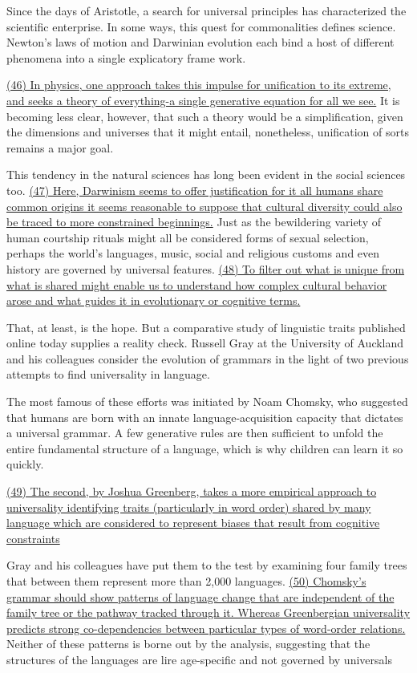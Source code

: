 Since the days of Aristotle, a search for universal principles has characterized the scientific enterprise. In some ways, this quest for commonalities defines science. Newton’s laws of motion and Darwinian evolution each bind a host of different phenomena into a single explicatory frame work.

\ul{(46) In physics, one approach takes this impulse for unification to its extreme, and seeks a theory of everything-a single generative equation for all we see.} It is becoming less clear, however, that such a theory would be a simplification, given the dimensions and universes that it might entail, nonetheless, unification of sorts remains a major goal.

This tendency in the natural sciences has long been evident in the social sciences too. \ul{(47) Here, Darwinism seems to offer justification for it all humans share common origins it seems reasonable to suppose that cultural diversity could also be traced to more constrained beginnings.} Just as the bewildering variety of human courtship rituals might all be considered forms of sexual selection, perhaps the world’s languages, music, social and religious customs and even history are governed by universal features. \ul{(48) To filter out what is unique from what is shared might enable us to understand how complex cultural behavior arose and what guides it in evolutionary or cognitive terms.}

That, at least, is the hope. But a comparative study of linguistic traits published online today supplies a reality check. Russell Gray at the University of Auckland and his colleagues consider the evolution of grammars in the light of two previous attempts to find universality in language.

The most famous of these efforts was initiated by Noam Chomsky, who suggested that humans are born with an innate language-acquisition capacity that dictates a universal grammar. A few generative rules are then sufficient to unfold the entire fundamental structure of a language, which is why children can learn it so quickly.

\ul{(49) The second, by Joshua Greenberg, takes a more empirical approach to universality identifying traits (particularly in word order) shared by many language which are considered to represent biases that result from cognitive constraints}

Gray and his colleagues have put them to the test by examining four family trees that between them represent more than 2,000 languages. \ul{(50) Chomsky’s grammar should show patterns of language change that are independent of the family tree or the pathway tracked through it. Whereas Greenbergian universality predicts strong co-dependencies between particular types of word-order relations.} Neither of these patterns is borne out by the analysis, suggesting that the structures of the languages are lire age-specific and not governed by universals 

